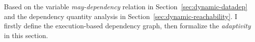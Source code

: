 
Based on the variable \emph{may-dependency} relation in Section~\ref{sec:dynamic-datadep} and 
the dependency quantity analysis in Section~\ref{sec:dynamic-reachability}.
I firstly define the execution-based dependency graph, then formalize the \emph{adaptivity} in this section.


